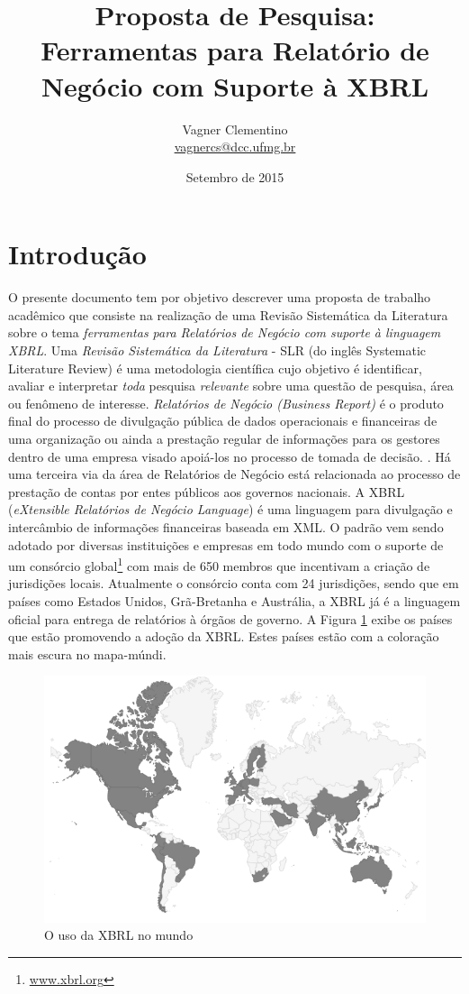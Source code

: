 \documentclass{article}
\title{Proposta de Pesquisa: \\
Ferramentas para Relatório de Negócio com Suporte à XBRL
}
\author{Vagner Clementino \\
       \url{vagnercs@dcc.ufmg.br}}
\date{Setembro de  2015}
\begin{document}
\maketitle

\section{Introdução}
\label{sec:intro}

O presente documento tem por objetivo descrever uma proposta de
trabalho acadêmico que  consiste na realização de uma Revisão Sistemática da
Literatura sobre o tema \textit{ferramentas para Relatórios de Negócio com suporte à linguagem XBRL}. Uma \textit{Revisão Sistemática da Literatura} - SLR (do inglês Systematic Literature Review) é uma
metodologia científica cujo objetivo é identificar, avaliar e interpretar
\textit{toda} pesquisa \textit{relevante} sobre uma questão de
pesquisa, área ou fenômeno de
interesse\cite{keele2007guidelines,wohlin2012experimentation}. \textit{Relatórios
  de Negócio (Business Report)} é o produto final do  processo de divulgação
pública de dados operacionais e financeiras de uma organização ou
ainda a prestação regular de informações para os gestores dentro
de uma empresa visado apoiá-los no processo de tomada de decisão.
\cite{lymer1999business}. Há uma terceira via da área de  Relatórios de Negócio
está relacionada ao processo de prestação de contas por entes públicos aos
governos nacionais. A XBRL (\textit{eXtensible Relatórios de Negócio
  Language}) é uma linguagem para divulgação e intercâmbio de
informações financeiras baseada em
XML\cite{xbrl_conceitos_aplicacoes}. O padrão vem sendo adotado por
diversas instituições e empresas em todo mundo com o suporte de um
consórcio global\footnote{\url{www.xbrl.org}} com mais de 650 membros
que incentivam a criação de jurisdições locais. Atualmente o consórcio
conta com 24 jurisdições, sendo que em países como  Estados Unidos,
Grã-Bretanha e Austrália, a XBRL já é a linguagem oficial para entrega
de relatórios à órgãos de governo. A Figura \ref{fig:world_map} exibe
os países que estão promovendo a adoção da XBRL. Estes países estão
com a coloração mais escura no mapa-múndi.

\begin{figure}[htb]
\centering
\includegraphics[width=.75\textwidth]{../img/world-map.png}
\caption{O uso da XBRL no mundo}
\label{fig:world_map}
\end{figure}
\end{document}
